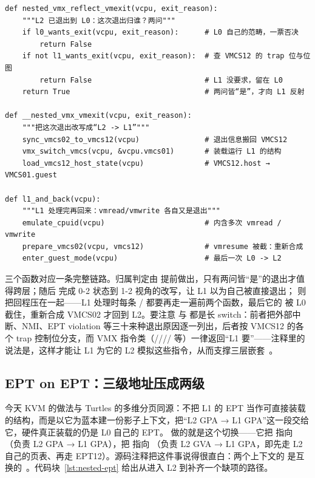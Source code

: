 \begin{lstlisting}[caption={一次 $L2 \to L0 \to L1 \to L0 \to L2$ 往返的控制流。依据 arch/x86/kvm/vmx/nested.c 的 nested\_vmx\_reflect\_vmexit()、\_\_nested\_vmx\_vmexit()、nested\_vmx\_run() 整理，为示意而非逐行对应。},label={lst:nested-exit},style=pseudopy]
def nested_vmx_reflect_vmexit(vcpu, exit_reason):
    """L2 已退出到 L0：这次退出归谁？两问"""
    if l0_wants_exit(vcpu, exit_reason):      # L0 自己的范畴，一票否决
        return False
    if not l1_wants_exit(vcpu, exit_reason):  # 查 VMCS12 的 trap 位与位图
        return False                          # L1 没要求，留在 L0
    return True                               # 两问皆“是”，才向 L1 反射

def __nested_vmx_vmexit(vcpu, exit_reason):
    """把这次退出改写成“L2 -> L1”"""
    sync_vmcs02_to_vmcs12(vcpu)               # 退出信息搬回 VMCS12
    vmx_switch_vmcs(vcpu, &vcpu.vmcs01)       # 装载运行 L1 的结构
    load_vmcs12_host_state(vcpu)              # VMCS12.host → VMCS01.guest

def l1_and_back(vcpu):
    """L1 处理完再回来：vmread/vmwrite 各自又是退出"""
    emulate_cpuid(vcpu)                       # 内含多次 vmread / vmwrite
    prepare_vmcs02(vcpu, vmcs12)              # vmresume 被截：重新合成
    enter_guest_mode(vcpu)                    # 最后一次 L0 -> L2
\end{lstlisting}

三个函数对应一条完整链路。归属判定由  提前做出，只有两问皆“是”的退出才值得跨层；随后  完成 0-2 状态到 1-2 视角的改写，让 L1 以为自己被直接退出； 则把回程压在一起——L1 处理时每条 / 都要再走一遍前两个函数，最后它的  被 L0 截住，重新合成 VMCS02 才回到 L2。要注意  与  都是长 switch：前者把外部中断、NMI、EPT violation 等三十来种退出原因逐一列出，后者按 VMCS12 的各个 trap 控制位分支，而 VMX 指令类（//// 等）一律返回“L1 要”——注释里的说法是，这样才能让 L1 为它的 L2 模拟这些指令，从而支撑三层嵌套~\cite{source5}。

\subsection{EPT on EPT：三级地址压成两级}\label{sec:nested-code-ept}

今天 KVM 的做法与 Turtles 的多维分页同源：不把 L1 的 EPT 当作可直接装载的结构，而是以它为蓝本建一份影子上下文，把“L2 GPA → L1 GPA”这一段交给它，硬件真正装载的仍是 L0 自己的 EPT。 做的就是这个切换——它把  指向 （负责 L2 GPA → L1 GPA），把  指向 （负责 L2 GVA → L1 GPA，即先走 L2 自己的页表、再走 EPT12）。源码注释把这件事说得很直白：两个上下文的  是互换的~\cite{source5}。代码块~\ref{lst:nested-ept} 给出从进入 L2 到补齐一个缺项的路径。

